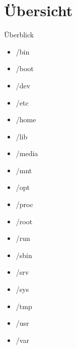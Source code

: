 \section{Übersicht}
\begin{frame}{Überblick}

\begin{minipage}{0.48\linewidth}
\begin{itemize}
\item /bin \onslide<5->{$ \leftarrow $}
\item /boot 
\item /dev 
\item /etc 
\item /home 
\item /lib 
\item /media 
\item /mnt 
\item /opt 
\end{itemize}
\end{minipage}%
\hspace{0.02cm}
\begin{minipage}{0.48\linewidth}
\begin{itemize}
\item /proc \onslide<5->{$ \leftarrow $}
\item /root 
\item /run 
\item /sbin 
\item /srv 
\item /sys 
\item /tmp 
\item /usr 
\item /var 
\end{itemize}
\end{minipage}

\vspace{1cm}
{\small
{}
}
\end{frame}
